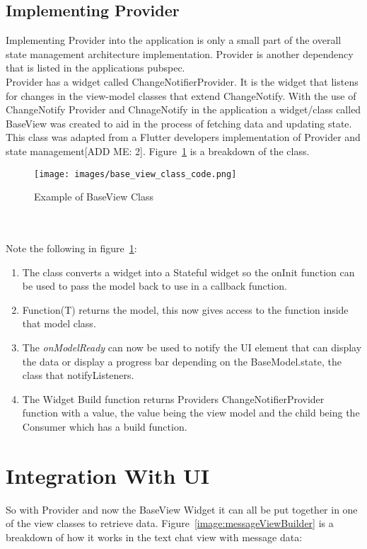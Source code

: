 \subsection{Implementing Provider}
Implementing Provider into the application is only a small part of the overall state management architecture implementation. Provider is another dependency that is listed in the applications pubspec.
\\ Provider has a widget called ChangeNotifierProvider. It is the widget that listens for changes in the view-model classes that extend ChangeNotify. With the use of ChangeNotify Provider and ChnageNotify in the application a widget/class called BaseView was created to aid in the process of fetching data and updating state. This class was adapted from a Flutter developers implementation of Provider and state management[ADD ME: 2]. Figure~\ref{image:baseViewClass} is a breakdown of the class.
\begin{figure}[h!]
    \caption{Example of BaseView Class}
    \label{image:baseViewClass}
    \centering
    \texttt{[image: images/base\_view\_class\_code.png]}
\end{figure}
\\\\Note the following in figure~\ref{image:baseViewClass}:
\begin{enumerate}
	\item The class converts a widget into a Stateful widget so the onInit function can be used to pass the model back to use in a callback function.
	\item Function(T) returns the model, this now gives access to the function inside that model class.
	\item The \textit{onModelReady} can now be used to notify the UI element that can display the data or display a progress bar depending on the BaseModel.state, the class that notifyListeners.
	\item The Widget Build function returns Providers ChangeNotifierProvider function with a value, the value being the view model and the child being the Consumer which has a build function. 
\end{enumerate}

\section{Integration With UI}
So with Provider and now the BaseView Widget it can all be put together in one of the view classes to retrieve data. Figure~\ref{image:messageViewBuilder} is a breakdown of how it works in the text chat view with message data:

